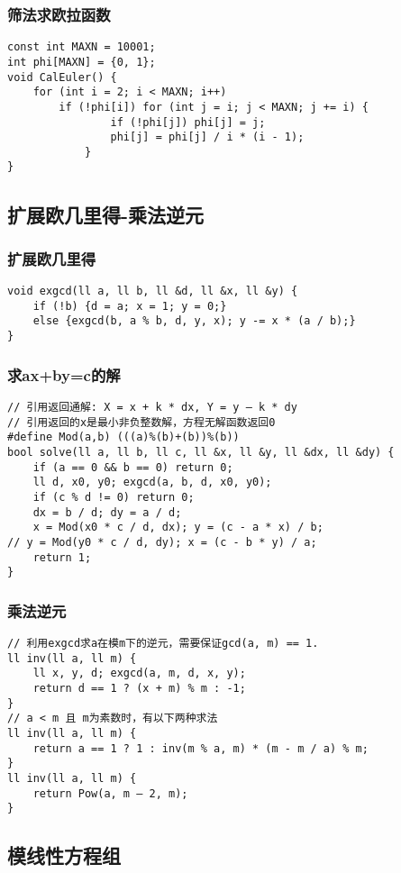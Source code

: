 \documentclass[a4paper]{article}
\begin{document}
\subsubsection{筛法求欧拉函数}
\begin{lstlisting}
const int MAXN = 10001;
int phi[MAXN] = {0, 1};
void CalEuler() {
	for (int i = 2; i < MAXN; i++)
		if (!phi[i]) for (int j = i; j < MAXN; j += i) {
				if (!phi[j]) phi[j] = j;
				phi[j] = phi[j] / i * (i - 1);
			}
}
\end{lstlisting}
\subsection{扩展欧几里得-乘法逆元}
\subsubsection{扩展欧几里得}
\begin{lstlisting}
void exgcd(ll a, ll b, ll &d, ll &x, ll &y) {
	if (!b) {d = a; x = 1; y = 0;}
	else {exgcd(b, a % b, d, y, x); y -= x * (a / b);}
}
\end{lstlisting}
\subsubsection{求ax+by=c的解}
\begin{lstlisting}
// 引用返回通解: X = x + k * dx, Y = y – k * dy
// 引用返回的x是最小非负整数解，方程无解函数返回0
#define Mod(a,b) (((a)%(b)+(b))%(b))
bool solve(ll a, ll b, ll c, ll &x, ll &y, ll &dx, ll &dy) {
	if (a == 0 && b == 0) return 0;
	ll d, x0, y0; exgcd(a, b, d, x0, y0);
	if (c % d != 0) return 0;
	dx = b / d; dy = a / d;
	x = Mod(x0 * c / d, dx); y = (c - a * x) / b; 
// y = Mod(y0 * c / d, dy); x = (c - b * y) / a;
	return 1;
}
\end{lstlisting}
\subsubsection{乘法逆元}
\begin{lstlisting}
// 利用exgcd求a在模m下的逆元，需要保证gcd(a, m) == 1.
ll inv(ll a, ll m) {
	ll x, y, d; exgcd(a, m, d, x, y);
	return d == 1 ? (x + m) % m : -1;
}
// a < m 且 m为素数时，有以下两种求法
ll inv(ll a, ll m) {
	return a == 1 ? 1 : inv(m % a, m) * (m - m / a) % m;
} 
ll inv(ll a, ll m) {
	return Pow(a, m – 2, m);
}
\end{lstlisting}
\subsection{模线性方程组}
\end{document}
